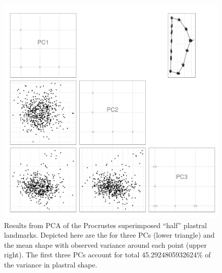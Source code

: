 \documentclass[12pt,letterpaper]{article}\usepackage{graphicx, color}
\begin{document}
\begin{figure}[ht]
  \centering
  \includegraphics[width = \textwidth]{figure/pca_res}
  \caption{Results from PCA of the Procrustes superimposed ``half'' plastral landmarks. Depicted here are the for three PCs (lower triangle) and the mean shape with observed variance around each point (upper right). The first three PCs account for total 45.2924805932624\% of the variance in plastral shape.}
  \label{fig:pca}
\end{figure}
\end{document}
